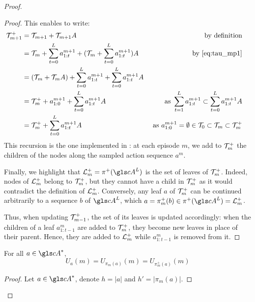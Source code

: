 \begin{subappendices}
\begin{proof}
\begin{proof}
		This enables to write:
		\begin{align*}
		\mathcal{T}_{m+1}^+ &= \mathcal{T}_{m+1} + \mathcal{T}_{m+1}A & \text{by definition}\\
		&= \mathcal{T}_{m} + \sum_{t=0}^L a^{m+1}_{1:t} + (\mathcal{T}_{m} + \sum_{t=0}^L a^{m+1}_{1:t})A & \text{by \eqref{eq:tau_mp1}} & \\
		&= (\mathcal{T}_{m} + \mathcal{T}_{m}A) + \sum_{t=0}^L a^{m+1}_{1:t} + \sum_{t=0}^L a^{m+1}_{1:t}A & \\
		&= \mathcal{T}_{m}^+ + a^{m+1}_{1:0} + \sum_{t=0}^L a^{m+1}_{1:t}A &\text{ as } \sum_{t=1}^L a^{m+1}_{1:t} \subset \sum_{t=0}^L a^{m+1}_{1:t}A\\
		&=  \mathcal{T}_{m}^+ + \sum_{t=0}^L a^{m+1}_{1:t}A  &\text{ as }a^{m+1}_{1:0}=\emptyset \in \mathcal{T}_{0} \subset \mathcal{T}_{m} \subset \mathcal{T}_m^+
		\end{align*}
		This recursion is the one implemented in : at each episode $m$, we add to $\mathcal{T}_{m}^+$ the children of the nodes along the sampled action sequence $a^{m}$.
		
		Finally, we highlight that $\LL_m^+ = \pi^+(\cA^L)$ is the set of leaves of $\mathcal{T}_{m}^+$.
		Indeed, nodes of $\mathcal{L}_m^+$ belong to $\mathcal{T}_{m}^+$, but they cannot have a child in $\mathcal{T}_{m}^+$ as it would contradict the definition of $\mathcal{L}_m^+$. Conversely, any leaf $a$ of $\mathcal{T}_{m}^+$ can be continued arbitrarily to a sequence $b$ of $\cA^L$, which  $a = \pi_m^+(b) \in \pi^+(\cA^L) = \LL_m^+$.
		
		Thus, when updating $\mathcal{T}_{m-1}^+$, the set of its leaves is updated accordingly: when the children of a leaf $a^m_{1:t-1}$ are added to $\mathcal{T}_m^+$, they become new leaves in place of their parent. Hence, they are added to $\mathcal{L}_m^+$ while $a^m_{1:t-1}$ is removed from it.
	\end{proof}
	
	\begin{lemma}
		\begin{leftbar}[lemmabar]
		\label{lemma:value-conservation}
		For all $a \in \cA^*$,
		\begin{equation*}
		U_a(m) = U_{\pi_m(a)}(m) = U_{\pi_m^+(a)}(m)
		\end{equation*}
		\end{leftbar}
	\end{lemma}
	\begin{proof}
		Let $a \in \cA^*$, denote $h=|a|$ and $h'=|\pi_m(a)|$.
		

\end{proof}
\end{proof}
\end{subappendices}

